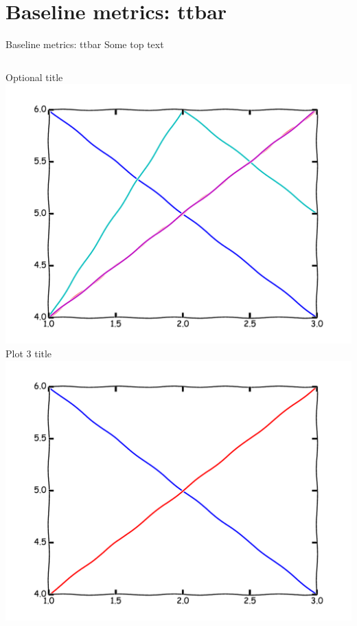 \section{Baseline metrics: ttbar}
\begin{frame}{Baseline metrics: ttbar}
Some top text
\begin{columns}
\begin{column}{0.4\textwidth}
\begin{center}
Optional title
\\
\includegraphics[width=\textwidth]{example/plot1.pdf}
\\
Plot 3 title
\\
\includegraphics[width=\textwidth]{example/plot3.pdf}
\\
\end{center}
\end{column}


\end{columns}
\end{frame}
